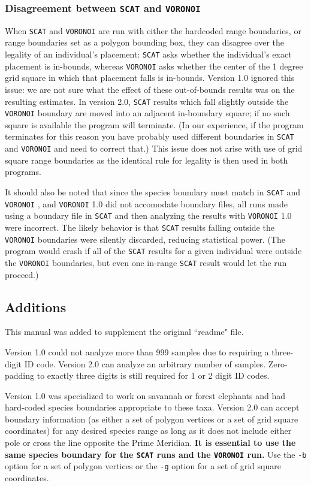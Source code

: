 \documentclass[10pt,titlepage,times,letterpaper]{article}
\def\SCAT{{\tt SCAT} }
\def\VORONOI{{\tt VORONOI} }
\begin{document}
\subsubsection{ Disagreement between \SCAT and \VORONOI}  
When \SCAT and \VORONOI are 
run with either the hardcoded range boundaries, or range
boundaries set as a polygon bounding box, they can disagree over the legality of an 
individual's placement:  \SCAT asks whether the individual's exact placement is in-bounds,
whereas \VORONOI asks whether the center of the 1 degree grid square in which that
placement falls is in-bounds.  Version 1.0 ignored this issue:  we are not sure what the
effect of these out-of-bounds results was on the resulting estimates.
In version 2.0, \SCAT results which fall slightly outside the
\VORONOI boundary are moved into an adjacent in-boundary square; if no such square is
available the program will terminate.  (In our experience, if the program terminates for
this reason you have probably used different boundaries in \SCAT and \VORONOI and need
to correct that.)   This issue does not arise with use of grid square
range boundaries as the identical rule for legality is then used in both programs.

It should also be noted that since the species boundary must match in \SCAT and \VORONOI,
and \VORONOI 1.0 did not accomodate boundary files, all runs made using a boundary file
in \SCAT and then analyzing the results with \VORONOI 1.0 were incorrect.  The
likely behavior is that \SCAT results falling outside the \VORONOI boundaries were
silently discarded, reducing statistical power.  (The program would crash
if all of the \SCAT results for a given individual were outside the
\VORONOI boundaries, but even one in-range \SCAT result would let the run proceed.)

\subsection{Additions}

This manual was added to supplement the original ``readme" file.

Version 1.0 could not analyze more than 999 samples due to requiring a three-digit
ID code.  Version 2.0 can analyze an arbitrary number of samples.  Zero-padding 
to exactly three digits is still required for 1 or 2 digit ID codes.

Version 1.0 was specialized to work on savannah or forest elephants and had hard-coded
species boundaries appropriate to these taxa.  Version 2.0 can accept boundary information
(as either a set of polygon vertices or a set of grid square coordinates) for
any desired species range as long as it does not include either pole or cross the line
opposite the Prime Meridian.
{\bf It is essential to use the same species boundary for the \SCAT runs and the \VORONOI run.}
Use the {\tt -b} option for a set of polygon vertices or the {\tt -g} option for
a set of grid square coordinates.
\end{document}
